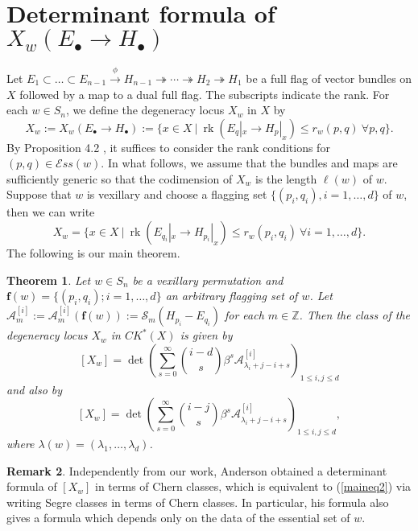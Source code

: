 \documentclass[12pt, reqno,sumlimits]{amsart}
\newtheorem{thm}{Theorem}[section]
\theoremstyle{definition}
\newtheorem{rem}[thm]{Remark}
\numberwithin{equation}{section}
\newcommand{\Ess}{{\mathcal{E}ss}}
\newcommand{\ZZ}{{\mathbb Z}}
\newcommand{\bff}{{\mathbf f }}
\newcommand{\CK}{{C\!K}}
\newcommand{\scA}{{\mathscr A}}
\newcommand{\scS}{{\mathscr S}}
\newcommand{\surj}{\twoheadrightarrow}
\newcommand{\rk}{{\operatorname{rk}}}
\begin{document}
\section{Determinant formula of $X_w(E_{\bullet} \to H_{\bullet})$}\label{SecMain}
Let $E_1 \subset \dots \subset E_{n-1} \stackrel{\phi}{\to} H_{n-1} \surj \cdots \surj H_2 \surj H_1$ be a full flag of vector bundles on $X$ followed by a map to a dual full flag. The subscripts indicate the rank. For each $w\in S_{n}$, we define the degeneracy locus $X_w$ in $X$ by
\[
X_w:=X_w(E_{\bullet} \to H_{\bullet}) := \{ x \in X \ |\ \rk(E_q|_x \to H_p|_x) \leq r_w(p,q) \ \forall p,q\}.
\]
By Proposition 4.2 \cite{FlagsFulton}, it suffices to consider the rank conditions for $(p,q) \in \Ess(w)$. In what follows, we assume that the bundles and maps are sufficiently generic so that the codimension of $X_w$ is the length $\ell(w)$ of $w$. 
Suppose that $w$ is vexillary and choose a flagging set $\{(p_i,q_i), i=1,\dots,d\}$ of $w$, then we can write
\[
X_w = \{ x \in X \ |\ \rk(E_{q_i}|_x \to H_{p_i}|_x) \leq r_w(p_i,q_i) \ \forall i=1,\dots,d\}.
\]
The following is our main theorem.
\begin{thm}\label{thmMainA}
Let $w \in S_n$ be a vexillary permutation and $\bff(w)=\{(p_i,q_i); i=1,\dots,d\}$ an arbitrary flagging set of $w$.  Let $\scA_{m}^{[i]}:=\scA_{m}^{[i]}(\bff(w)):=\scS_{m}(H_{p_i}-E_{q_i})$ for each $m\in \ZZ$. Then the class of the degeneracy locus $X_w$ in $\CK^*(X)$ is given by
\begin{equation}\label{maineq1}
[X_w] = \det\left(  \sum_{s=0}^{\infty} \binom{i-d}{s}\beta^s \scA_{\lambda_i+j-i+s}^{[i]} \right)_{1\leq i,j \leq d}
\end{equation}
and also by
\begin{equation}\label{maineq2}
[X_w] = \det\left(  \sum_{s=0}^{\infty} \binom{i-j}{s}\beta^s \scA_{\lambda_i+j-i+s}^{[i]} \right)_{1\leq i,j \leq d},
\end{equation}
where $\lambda(w)=(\lambda_1,\dots,\lambda_d)$.
\end{thm}
\begin{rem}
Independently from our work, Anderson \cite{Anderson2016} obtained a determinant formula of $[X_w]$ in terms of Chern classes, which is equivalent to (\ref{maineq2}) via writing Segre classes in terms of Chern classes. In particular, his formula also gives a formula which depends only on the data of the essential set of $w$.
\end{rem}
\end{document}
